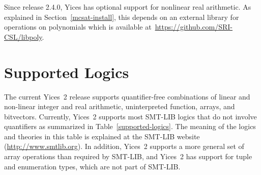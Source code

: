 \documentclass[11pt,twoside,fleqn,openright,titlepage]{cslreport}
\begin{document}
Since release 2.4.0, Yices has optional support for nonlinear real
arithmetic. As explained in Section~\ref{mcsat-install}, this depends
on an external library for operations on polynomials which is
available at~\url{https://github.com/SRI-CSL/libpoly}.


\section{Supported Logics}

The current Yices~2 release supports quantifier-free combinations of
linear and non-linear integer and real arithmetic, uninterpreted
function, arrays, and bitvectors. Currently, Yices~2 supports most
SMT-LIB logics that do not involve quantifiers as summarized in
Table~\ref{supported-logics}.  The meaning of the logics and theories
in this table is explained at the SMT-LIB website
(\url{http://www.smtlib.org}).  In addition, Yices~2 supports a more
general set of array operations than required by SMT-LIB, and Yices~2
has support for tuple and enumeration types, which are not part of
SMT-LIB.


\newcommand{\desc}[1]{\parbox[c][1.6em][c]{9cm}{{\footnotesize #1}}}
\newcommand{\ddesc}[1]{\parbox[c][2.6em]{9cm}{{\footnotesize #1}}}
\end{document}
